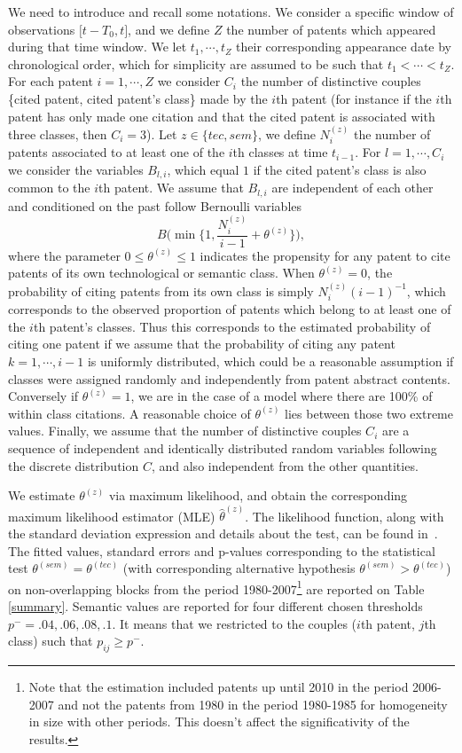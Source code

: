 \documentclass[10pt,A4,draft]{article}
\begin{document}
We need to introduce and recall some notations. We consider a specific window of observations $\big[t- T_0, t \big]$, and we define $Z$ the number of patents which appeared during that time window. We let $t_1, \cdots, t_Z$ their corresponding appearance date by chronological order, which for simplicity are assumed to be such that $t_1 < \cdots < t_Z$. For each patent $i=1, \cdots, Z$ we consider $C_i$ the number of distinctive couples \{cited patent, cited patent's class\} made by the $i$th patent (for instance if the $i$th patent has only made one citation and that the cited patent is associated with three classes, then $C_i = 3$). Let $z \in \{tec, sem\}$, we define $N_{i}^{(z)}$  the number of patents associated to at least one of the $i$th classes at time $t_{i-1}$. For $l = 1, \cdots, C_i$ we consider the variables $B_{l,i}$, which equal $1$ if the cited patent's class is also common to the $i$th patent. We assume that $B_{l,i}$ are independent of each other and conditioned on the past follow Bernoulli variables 
$$B \Big( \min \Big\{ 1, \frac{N_{i}^{(z)}}{i-1} + \theta^{(z)} \Big\} \Big),$$ 
where the parameter $0 \leq \theta^{(z)} \leq 1$ indicates the propensity for any patent to cite patents of its own technological or semantic class. When $\theta^{(z)} = 0$, the probability of citing patents from its own class is simply $N_{i}^{(z)}(i-1)^{-1}$, which corresponds to the observed proportion of patents which belong to at least one of the $i$th patent's classes. Thus this corresponds to the estimated probability of citing one patent if we assume that the probability of citing any patent $k=1, \cdots, i-1$ is uniformly distributed, which could be a reasonable assumption if classes were assigned randomly and independently from patent abstract contents. Conversely if $\theta^{(z)} = 1$, we are in the case of a model where there are 100\% of within class citations. A reasonable choice of $\theta^{(z)}$ lies between those two extreme values. Finally, we assume that the number of distinctive couples $C_i$ are a sequence of independent and identically distributed random variables following the discrete distribution $C$, and also independent from the other quantities.

We estimate $\theta^{(z)}$ via maximum likelihood, and obtain the corresponding maximum likelihood estimator (MLE) $\hat{\theta}^{(z)}$. The likelihood function, along with the standard deviation expression and details about the test, can be found in~. The fitted values, standard errors and p-values corresponding to the statistical test $\theta^{(sem)} = \theta^{(tec)}$ (with corresponding alternative hypothesis $\theta^{(sem)} > \theta^{(tec)}$) on non-overlapping blocks from the period 1980-2007\footnote{Note that the estimation included patents up until 2010 in the period 2006-2007 and not the patents from 1980 in the period 1980-1985 for homogeneity in size with other periods. This doesn't affect the significativity of the results.} are reported on Table \ref{summary}. Semantic values are reported for four different chosen thresholds $p^{-}=.04, .06, .08, .1$. It means that we restricted to the couples ($i$th patent, $j$th class) such that $p_{ij} \geq p^{-}$. 
\end{document}
